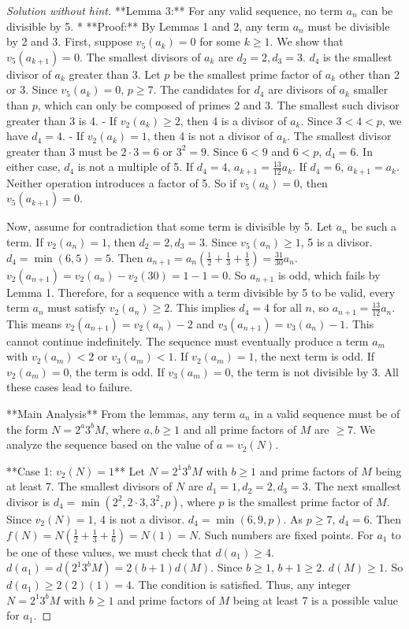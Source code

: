\begin{proof} [Solution without hint]
**Lemma 3:** For any valid sequence, no term $a_n$ can be divisible by 5.
*   **Proof:** By Lemmas 1 and 2, any term $a_n$ must be divisible by 2 and 3.
    First, suppose $v_5(a_k)=0$ for some $k \ge 1$. We show that $v_5(a_{k+1})=0$.
    The smallest divisors of $a_k$ are $d_2=2, d_3=3$. $d_4$ is the smallest divisor of $a_k$ greater than 3. Let $p$ be the smallest prime factor of $a_k$ other than 2 or 3. Since $v_5(a_k)=0$, $p \ge 7$. The candidates for $d_4$ are divisors of $a_k$ smaller than $p$, which can only be composed of primes 2 and 3. The smallest such divisor greater than 3 is 4.
    - If $v_2(a_k) \ge 2$, then 4 is a divisor of $a_k$. Since $3 < 4 < p$, we have $d_4=4$.
    - If $v_2(a_k) = 1$, then 4 is not a divisor of $a_k$. The smallest divisor greater than 3 must be $2 \cdot 3 = 6$ or $3^2=9$. Since $6 < 9$ and $6 < p$, $d_4=6$.
    In either case, $d_4$ is not a multiple of 5.
    If $d_4=4$, $a_{k+1} = \frac{13}{12}a_k$. If $d_4=6$, $a_{k+1}=a_k$. Neither operation introduces a factor of 5. So if $v_5(a_k)=0$, then $v_5(a_{k+1})=0$.

    Now, assume for contradiction that some term is divisible by 5. Let $a_n$ be such a term.
    If $v_2(a_n)=1$, then $d_2=2, d_3=3$. Since $v_5(a_n)\ge 1$, 5 is a divisor. $d_4=\min(6,5)=5$.
    Then $a_{n+1} = a_n\left(\frac{1}{2}+\frac{1}{3}+\frac{1}{5}\right) = \frac{31}{30}a_n$.
    $v_2(a_{n+1}) = v_2(a_n) - v_2(30) = 1-1=0$. So $a_{n+1}$ is odd, which fails by Lemma 1.
    Therefore, for a sequence with a term divisible by 5 to be valid, every term $a_n$ must satisfy $v_2(a_n) \ge 2$.
    This implies $d_4=4$ for all $n$, so $a_{n+1} = \frac{13}{12}a_n$. This means $v_2(a_{n+1}) = v_2(a_n)-2$ and $v_3(a_{n+1}) = v_3(a_n)-1$. This cannot continue indefinitely. The sequence must eventually produce a term $a_m$ with $v_2(a_m)<2$ or $v_3(a_m)<1$. If $v_2(a_m)=1$, the next term is odd. If $v_2(a_m)=0$, the term is odd. If $v_3(a_m)=0$, the term is not divisible by 3. All these cases lead to failure.

**Main Analysis**
From the lemmas, any term $a_n$ in a valid sequence must be of the form $N=2^a 3^b M$, where $a,b \ge 1$ and all prime factors of $M$ are $\ge 7$. We analyze the sequence based on the value of $a=v_2(N)$.

**Case 1: $v_2(N)=1$**
Let $N = 2^1 3^b M$ with $b \ge 1$ and prime factors of $M$ being at least 7. The smallest divisors of $N$ are $d_1=1, d_2=2, d_3=3$. The next smallest divisor is $d_4=\min(2^2, 2\cdot3, 3^2, p)$, where $p$ is the smallest prime factor of $M$. Since $v_2(N)=1$, $4$ is not a divisor. $d_4=\min(6,9,p)$. As $p \ge 7$, $d_4=6$.
Then $f(N) = N\left(\frac{1}{2}+\frac{1}{3}+\frac{1}{6}\right) = N(1) = N$.
Such numbers are fixed points. For $a_1$ to be one of these values, we must check that $d(a_1) \ge 4$.
$d(a_1) = d(2^1 3^b M) = 2(b+1)d(M)$. Since $b \ge 1$, $b+1 \ge 2$. $d(M) \ge 1$.
So $d(a_1) \ge 2(2)(1) = 4$. The condition is satisfied.
Thus, any integer $N=2^1 3^b M$ with $b \ge 1$ and prime factors of $M$ being at least 7 is a possible value for $a_1$.


\end{proof}
